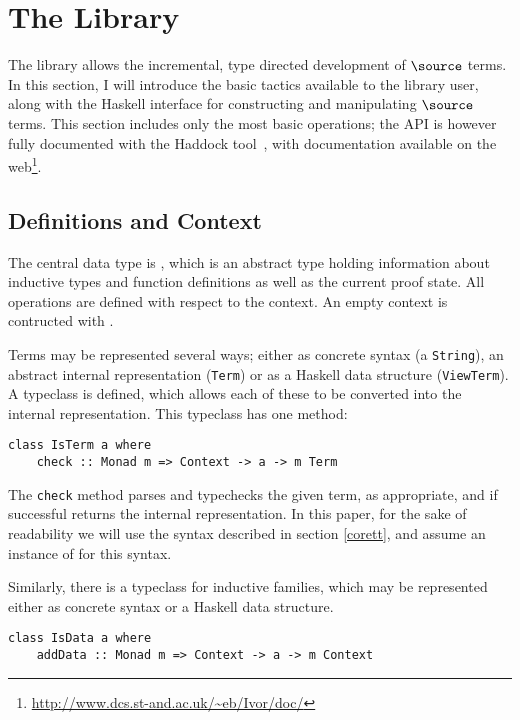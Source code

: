 \section{The \Ivor{} Library}


The \Ivor{} library allows the incremental, type directed development
of $\source$ terms.
In this section, I will introduce the
basic tactics available to the library user, along with the Haskell
interface for constructing and manipulating $\source$ terms. This
section includes only the most basic operations; the API is however
fully documented with the Haddock tool~\cite{haddock}, with
documentation available on the web\footnote{\url{http://www.dcs.st-and.ac.uk/~eb/Ivor/doc/}}.

\subsection{Definitions and Context}

The central data type is , which is an abstract type
holding information about inductive types and function definitions as
well as the current proof state. All operations are defined with
respect to the context. An empty context is contructed with
.

Terms may be represented several ways; either as concrete syntax (a
\texttt{String}), an abstract internal representation (\texttt{Term})
or as a Haskell data structure (\texttt{ViewTerm}). A typeclass
 is defined, which allows each of these to be converted
into the internal representation. This typeclass has one method:

\begin{verbatim}
class IsTerm a where
    check :: Monad m => Context -> a -> m Term
\end{verbatim}

The \texttt{check} method parses and typechecks the given term, as
appropriate, and if successful returns the internal representation. In
this paper, for the sake of readability we will use the syntax
described in section \ref{corett}, and assume an instance of
 for this syntax.

Similarly, there is a typeclass for inductive families,
which may be represented either as concrete syntax or a Haskell data
structure.

\begin{verbatim}
class IsData a where
    addData :: Monad m => Context -> a -> m Context
\end{verbatim}

